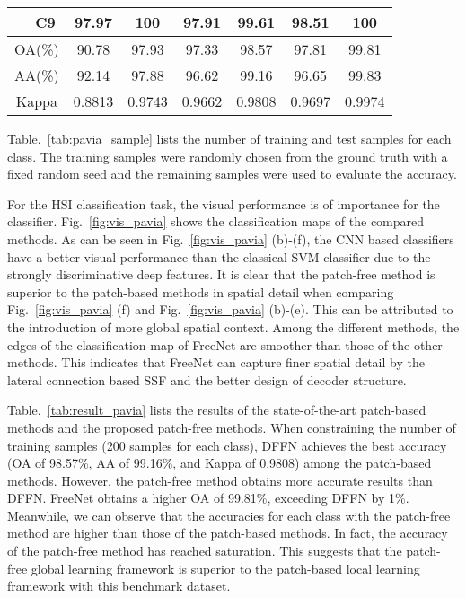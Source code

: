 \documentclass[journal]{IEEEtran}
\begin{document}
\begin{table}[hbt]
{\begin{tabular}{c|c|ccccc|c}
                                                    & C9                               & 97.97                          & 100       & 97.91  & 99.61   & 98.51                   & 100   \\ \hline
      \multicolumn{2}{c|}{OA(\%)}                   & 90.78                            & 97.93                          & 97.33     & 98.57 & 97.81 & 99.81                               \\
      \multicolumn{2}{c|}{AA(\%)}                   & 92.14                            & 97.88                          & 96.62     & 99.16 & 96.65 & 99.83                               \\
      \multicolumn{2}{c|}{Kappa}                    & 0.8813                           & 0.9743                         & 0.9662    & 0.9808&  0.9697 & 0.9974                              \\ \hline
    \end{tabular}
  }
\end{table}

Table.~\ref{tab:pavia_sample} lists the number of training and test samples for each class.
The training samples were randomly chosen from the ground truth with a fixed random seed and the remaining samples were used to evaluate the accuracy.


For the HSI classification task, the visual performance is of importance for the classifier.
Fig.~\ref{fig:vis_pavia} shows the classification maps of the compared methods.
As can be seen in Fig.~\ref{fig:vis_pavia} (b)-(f), the CNN based classifiers have a better visual performance than the classical SVM classifier due to the strongly discriminative deep features.
It is clear that the patch-free method is superior to the patch-based methods in spatial detail when comparing Fig.~\ref{fig:vis_pavia} (f) and Fig.~\ref{fig:vis_pavia} (b)-(e).
This can be attributed to the introduction of more global spatial context.
Among the different methods, the edges of the classification map of FreeNet are smoother than those of the other methods.
This indicates that FreeNet can capture finer spatial detail by the lateral connection based SSF and the better design of decoder structure.


Table.~\ref{tab:result_pavia} lists the results of the state-of-the-art patch-based methods and the proposed patch-free methods.
When constraining the number of training samples (200 samples for each class), DFFN achieves the best accuracy (OA of 98.57\%, AA of 99.16\%, and Kappa of 0.9808) among the patch-based methods.
However, the patch-free method obtains more accurate results than DFFN.
FreeNet obtains a higher OA of 99.81\%, exceeding DFFN by 1\%.
Meanwhile, we can observe that the accuracies for each class with the patch-free method are higher than those of the patch-based methods.
In fact, the accuracy of the patch-free method has reached saturation.
This suggests that the patch-free global learning framework is superior to the patch-based local learning framework with this benchmark dataset.
\end{document}

